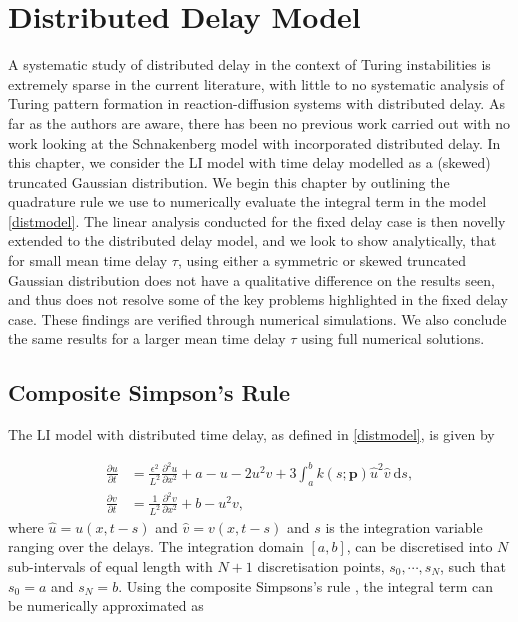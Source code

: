 \chapter{Distributed Delay Model}\label{section:distdel}
A systematic study of distributed delay in the context of Turing instabilities is extremely sparse in the current literature, with little to no systematic analysis of Turing pattern formation in reaction-diffusion systems with distributed delay. As far as the authors are aware, there has been no previous work carried out with no work looking at the Schnakenberg model with incorporated distributed delay. In this chapter, we consider the LI model with time delay modelled as a (skewed) truncated Gaussian distribution. We begin this chapter by outlining the quadrature rule we use to numerically evaluate the integral term in the model \eqref{distmodel}. The linear analysis conducted for the fixed delay case is then novelly extended to the distributed delay model, and we look to show analytically, that for small mean time delay $\tau$, using either a symmetric or skewed truncated Gaussian distribution does not have a qualitative difference on the results seen, and thus does not resolve some of the key problems highlighted in the fixed delay case. These findings are verified through numerical simulations. We also conclude the same results for a larger mean time delay $\tau$ using full numerical solutions.
\section{Composite Simpson's Rule}\label{section:quad}

The LI model with distributed time delay, as defined in \eqref{distmodel}, is given by

\begin{equation}\label{distmodel2}
  \begin{split}
    \frac{\partial u}{\partial t}&=\frac{\epsilon^2}{L^2}\frac{\partial^2u}{\partial x^2}+a-u-2u^2v+3\int_{a}^{b}k(s;\textbf{p})\hat{u}^2\hat{v} \ \text{d}s,\\
    \frac{\partial v}{\partial t}&=\frac{1}{L^2}\frac{\partial^2v}{\partial x^2}+b-u^2v,
\end{split}
\end{equation}
where $\hat{u}=u(x,t-s)$ and $\hat{v}=v(x,t-s)$ and $s$ is the integration variable ranging over the delays. The integration domain $[a, b]$, can be discretised into $N$ sub-intervals of equal length with $N+1$ discretisation points, $s_0,\cdots,s_{N}$, such that $s_0=a$ and $s_N=b$. Using the composite Simpsons's rule \cite{compsimp}, the integral term can be numerically approximated as

